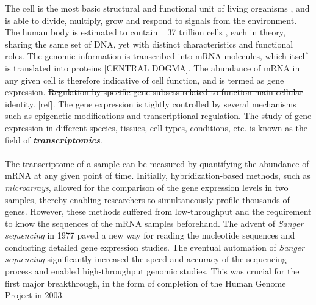 The cell is the most basic structural and functional unit of living organisms \textbf{\cite{regev_human_nodate}}, and is able to divide, multiply, grow and respond to signals from the environment. The human body is estimated to contain ~ 37 trillion cells \textbf{\cite{wen_recent_2022}}, each in theory, sharing the same set of DNA, yet with distinct characteristics and functional roles. The genomic information is transcribed into mRNA molecules, which itself is translated into proteins [CENTRAL DOGMA]. The abundance of mRNA in any given cell is therefore indicative of cell function, and is termed as gene expression. \st{Regulation by specific gene subsets related to function main cellular identity. [ref]}. The gene expression is tightly controlled by several mechanisms such as epigenetic modifications and transcriptional regulation. The study of gene expression in different species, tissues, cell-types, conditions, etc. is known as the field of \textit{\textbf{transcriptomics}}.\\\\
The transcriptome of a sample can be measured by quantifying the abundance of mRNA at any given point of time. Initially, hybridization-based methods, such as \textit{microarrays}, allowed for the comparison of the gene expression levels in two samples, thereby enabling researchers to simultaneously profile thousands of genes. However, these methods suffered from low-throughput and the requirement to know the sequences of the mRNA samples beforehand. The advent of \textit{Sanger sequencing} in 1977 paved a new way for reading the nucleotide sequences and conducting detailed gene expression studies. The eventual automation of \textit{Sanger sequencing} significantly increased the speed and accuracy of the sequencing process and enabled high-throughput genomic studies. This was crucial for the first major breakthrough, in the form of completion of the Human Genome Project in 2003.\\\\
